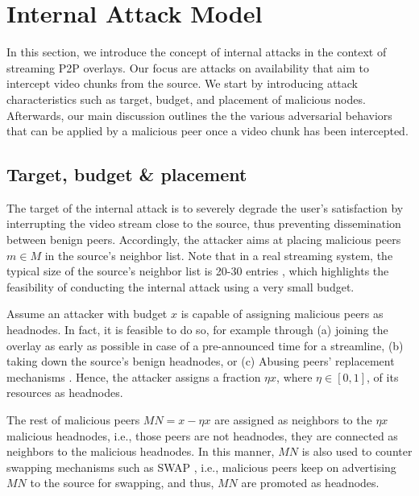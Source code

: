 \section{Internal Attack Model}
\label{sec:Attack}

In this section, we introduce the concept of internal attacks in the context of streaming P2P overlays.
Our focus are attacks on availability that aim to intercept video chunks from the source. 
We start by introducing attack characteristics such as target, budget, and placement of malicious nodes. 
Afterwards, our main discussion outlines the the various adversarial behaviors that can be applied by a malicious peer once a video chunk has been intercepted. 

\subsection{Target, budget \& placement}

The target of the internal attack is to severely degrade the user's satisfaction by 
interrupting the video stream close to the source, thus preventing dissemination between benign peers.
Accordingly, the attacker aims at placing malicious peers $m\in M$ in the source's neighbor list.
Note that in a real streaming system, the typical size of the source's neighbor list is 20-30 entries \cite{neighborlist1,neighborlist2}, which highlights the feasibility of conducting the internal attack using a very small budget.

Assume an attacker with budget $x$ is capable of assigning malicious peers as headnodes.
In fact, it is feasible to do so, for example through (a) joining the overlay as early as possible in case of a pre-announced time for a streamline, (b) taking down the source's benign headnodes, or (c) Abusing peers' replacement mechanisms \cite{nguyen2016swap}.
Hence, the attacker assigns a fraction $\eta x$, where $\eta\in [0,1]$, of its resources as headnodes.

The rest of malicious peers $MN=x-\eta x$ are assigned as neighbors to the $\eta x$ malicious headnodes, i.e., those peers are not headnodes, they are connected as neighbors to the malicious headnodes. 
In this manner, $MN$ is also used to counter swapping mechanisms such as SWAP \cite{nguyen2016swap}, i.e., malicious peers keep on advertising $MN$ to the source for swapping, and thus, $MN$ are promoted as headnodes.

